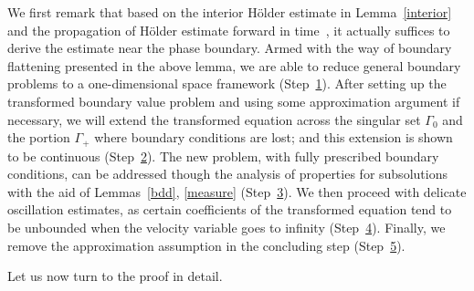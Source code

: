 \documentclass[10pt]{amsart}
\theoremstyle{definition}\newtheorem{defi}[theo]{Definition}\newtheorem{rema}[theo]{Remark}\newtheorem{exam}[theo]{Example}\newtheorem{exem}[theo]{Example}\newtheorem{nota}[theo]{Notation}
\begin{document}
We first remark that based on the interior H\"older estimate in Lemma~\ref{interior} and the propagation of H\"older estimate forward in time~\cite[Corollary~4.6]{YZ}, it actually suffices to derive the estimate near the phase boundary. Armed with the way of boundary flattening presented in the above lemma, we are able to reduce general boundary problems to a one-dimensional space framework (Step~\hyperref[step1]{1}). After setting up the transformed boundary value problem and using some approximation argument if necessary, we will extend the transformed equation across the singular set $\Gamma_0$ and the portion $\Gamma_+$ where boundary conditions are lost; and this extension is shown to be continuous (Step~\hyperref[step2]{2}). The new problem, with fully prescribed boundary conditions, can be addressed though the analysis of properties for subsolutions with the aid of Lemmas~\ref{bdd}, \ref{measure} (Step~\hyperref[step3]{3}). We then proceed with delicate oscillation estimates, as certain coefficients of the transformed equation tend to be unbounded when the velocity variable goes to infinity (Step~\hyperref[step4]{4}). Finally, we remove the approximation assumption in the concluding step (Step~\hyperref[step5]{5}).

Let us now turn to the proof in detail.
\end{document}
